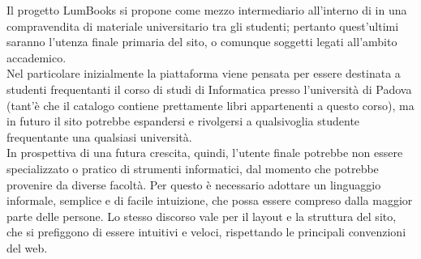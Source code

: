 Il progetto LumBooks si propone come mezzo intermediario all'interno di in una compravendita di materiale universitario tra gli studenti; pertanto quest'ultimi saranno l'utenza finale primaria del sito, o comunque soggetti legati all'ambito accademico. \\ 
Nel particolare inizialmente la piattaforma viene pensata per essere destinata a studenti frequentanti il corso di studi di Informatica presso l'università di Padova (tant'è che il catalogo contiene prettamente libri appartenenti a questo corso), ma in futuro il sito potrebbe espandersi e rivolgersi a qualsivoglia studente frequentante una qualsiasi università.\\
In prospettiva di una futura crescita, quindi, l'utente finale potrebbe non essere specializzato o pratico di strumenti informatici, dal momento che potrebbe provenire da diverse facoltà. Per questo è necessario adottare un linguaggio informale, semplice e di facile intuizione, che possa essere compreso dalla maggior parte delle persone. Lo stesso discorso vale per il layout e la struttura del sito, che si prefiggono di essere intuitivi e veloci, rispettando le principali convenzioni del web.\\
